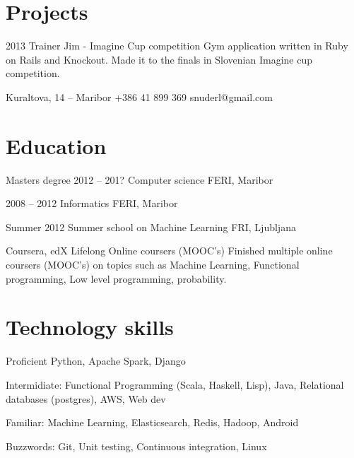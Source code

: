 \documentclass{tccv}
\begin{document}
\section{Projects}

\begin{yearlist}

\item{2013}
     {Trainer Jim - Imagine Cup competition}
     {Gym application written in Ruby on Rails and Knockout. Made it to the finals in Slovenian Imagine cup competition.}

\end{yearlist}




\personal
    {Kuraltova, 14 -- Maribor}
    {+386 41 899 369}
    {snuderl@gmail.com}
    


\section{Education}

\begin{yearlist}

\item[Masters degree]{2012 -- 201?}
     {Computer science}
     {FERI, Maribor}

\item{2008 -- 2012}
     {Informatics}
     {FERI, Maribor}
     
\item{Summer 2012}
    {Summer school on Machine Learning}
    {FRI, Ljubljana}
     
\item[Coursera, edX]
    {Lifelong}
    {Online coursers (MOOC's)}
    {Finished multiple online coursers (MOOC's) on topics such as Machine Learning, Functional programming, Low level programming, probability.}

\end{yearlist} 


\section{Technology skills}

\begin{factlist}

\item{Proficient}
     {Python, Apache Spark, Django}

\item{Intermidiate:}
     {Functional Programming (Scala, Haskell, Lisp), Java, Relational databases (postgres), AWS, Web dev}
     
\item{Familiar:}
     {Machine Learning, Elasticsearch, Redis, Hadoop, Android}

\item{Buzzwords:}
     {Git, Unit testing, Continuous integration, Linux}

\end{factlist}
\end{document}

